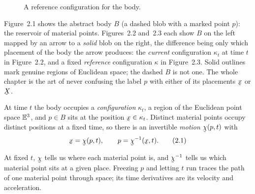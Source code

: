 \begin{figure}[htbp]\centering
{}
\caption{A reference configuration for the body.}\label{fig:2.3}
\end{figure}

\begin{remark}\label{rem:fig123}
Figure~2.1 shows the abstract body $B$ (a dashed blob with a marked point
$p$): the reservoir of material points. Figures~2.2 and~2.3 each show $B$ on
the left mapped by an arrow to a \emph{solid} blob on the right, the
difference being only which placement of the body the arrow produces: the
\emph{current} configuration $\kappa_t$ at time $t$ in Figure~2.2, and a
fixed \emph{reference} configuration $\kappa$ in Figure~2.3. Solid outlines
mark genuine regions of Euclidean space; the dashed $B$ is not one. The
whole chapter is the art of never confusing the label $p$ with either of
its placements $\bx$ or $\bX$.
\end{remark}

\begin{definition}\label{def:motion}
At time $t$ the body occupies a \emph{configuration} $\kappa_t$, a region of
the Euclidean point space $\mathbb{E}^{3}$, and $p\in B$ sits at the position
$\bx\in\kappa_t$. Distinct material points occupy distinct positions at a
fixed time, so there is an invertible \emph{motion} $\bchi(p,t)$ with
\begin{equation}
   \bx=\bchi(p,t),\qquad p=\bchi^{-1}(\bx,t). \tag{2.1}\label{eq:2.1}
\end{equation}
\end{definition}

At fixed $t$, $\bchi$ tells us where each material point is, and
$\bchi^{-1}$ tells us which material point sits at a given place. Freezing
$p$ and letting $t$ run traces the path of one material point through
space; its time derivatives are its velocity and acceleration.

